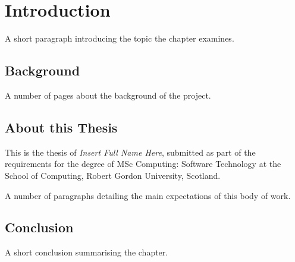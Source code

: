 \chapter{Introduction}
 \setcounter{page}{1}

A short paragraph introducing the topic the chapter examines.


\section{Background}

A number of pages about the background of the project.

\section{About this Thesis}
This is the thesis of \emph{Insert Full Name Here}, submitted as part of the requirements for the degree of MSc Computing: Software Technology at the School of Computing, Robert Gordon University, Scotland.

A number of paragraphs detailing the main expectations of this body of work.


\section{Conclusion}
A short conclusion summarising the chapter.
